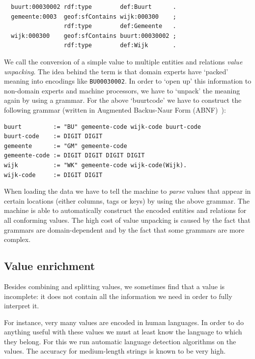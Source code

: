 \documentclass[a4paper]{scrartcl}
\begin{document}
\begin{verbatim}
  buurt:00030002 rdf:type        def:Buurt      .
  gemeente:0003  geof:sfContains wijk:000300    ;
                 rdf:type        def:Gemeente   .
  wijk:000300    geof:sfContains buurt:00030002 ;
                 rdf:type        def:Wijk       .
\end{verbatim}

We call the conversion of a simple value to multiple entities and
relations \emph{value unpacking}.  The idea behind the term is that
domain experts have `packed' meaning into encodings like
\texttt{BU00030002}.  In order to `open up' this information to
non-domain experts and machine processors, we have to `unpack' the
meaning again by using a grammar.  For the above `buurtcode' we have
to construct the following grammar (written in Augmented Backus-Naur
Form (ABNF)~\cite{Crocker2008}):

\begin{verbatim}
buurt         := "BU" gemeente-code wijk-code buurt-code
buurt-code    := DIGIT DIGIT
gemeente      := "GM" gemeente-code
gemeente-code := DIGIT DIGIT DIGIT DIGIT
wijk          := "WK" gemeente-code wijk-code(Wijk).
wijk-code     := DIGIT DIGIT
\end{verbatim}

When loading the data we have to tell the machine to \emph{parse}
values that appear in certain locations (either columns, tags or keys)
by using the above grammar.  The machine is able to automatically
construct the encoded entities and relations for all conforming
values.  The high cost of value unpacking is caused by the fact that
grammars are domain-dependent and by the fact that some grammars are
more complex.


\subsection{Value enrichment}
\label{sec:value_enrichment}

Besides combining and splitting values, we sometimes find that a value
is incomplete: it does not contain all the information we need in
order to fully interpret it.

For instance, very many values are encoded in human languages.  In
order to do anything useful with these values we must at least know
the language to which they belong.  For this we run automatic language
detection algorithms on the values.  The accuracy for medium-length
strings is known to be very high.~\cite{Beek2016c}
\end{document}
